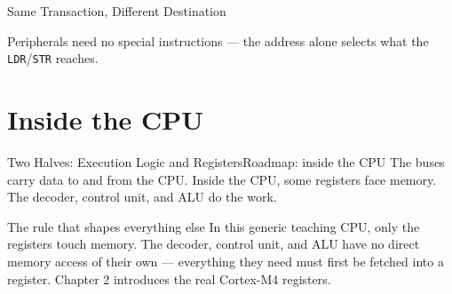 \documentclass[9pt,aspectratio=169,xcolor=table]{beamer}
\begin{document}
\begin{frame}{Same Transaction, Different Destination}
    \vspace{4mm}
    \begin{center}
    \end{center}

    \vspace{1mm}
    {\footnotesize Peripherals need \alert{no special instructions} ---
    the address alone selects what the \texttt{LDR}/\texttt{STR} reaches.}
\end{frame}


\section{Inside the CPU}

\begin{frame}{Two Halves: Execution Logic and Registers}{Roadmap: inside the CPU}
    \leavevmode
    {\small The buses carry data to and from the CPU. Inside the CPU,
    some \alert{registers face memory}. The \alert{decoder, control
    unit, and ALU} do the work.}

    \vspace{3mm}
    \begin{center}
    \end{center}

    \vspace{3mm}
    \begin{block}{The rule that shapes everything else}
        In this generic teaching CPU, \alert{only the registers touch memory.}
        The decoder, control unit, and ALU have \alert{no direct memory
        access} of their own --- everything they need must first be
        fetched into a register. Chapter 2 introduces the real
        Cortex-M4 registers.
    \end{block}
\end{frame}
\end{document}
